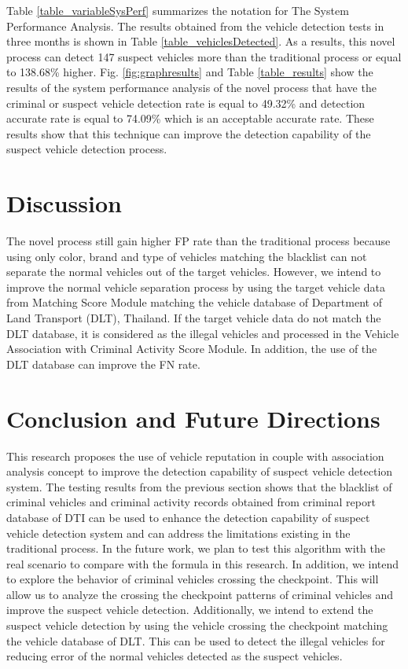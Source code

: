\documentclass{llncs}
\begin{document}
Table \ref{table_variableSysPerf} summarizes the notation for The System Performance Analysis.
The results obtained from the vehicle detection tests in three months is shown in Table \ref{table_vehiclesDetected}.
As a results, this novel process can detect 147 suspect vehicles more than the traditional process or equal to 138.68\% higher.
Fig. \ref{fig:graphresults} and Table \ref{table_results} show the results of the system performance analysis of the novel process that have the criminal or suspect vehicle detection rate is equal to 49.32\% and detection accurate rate is equal to 74.09\% which is an acceptable accurate rate. These results show that this technique can improve the detection capability of the suspect vehicle detection process.

\section{Discussion}
The novel process still gain higher FP rate than the traditional process because using only color, brand and type of vehicles matching the blacklist can not separate the normal vehicles out of the target vehicles. However, we intend to improve the normal vehicle separation process by using the target vehicle data from Matching Score Module matching the vehicle database of Department of Land Transport (DLT), Thailand. If the target vehicle data do not match the DLT database, it is considered as the illegal vehicles and processed in the Vehicle Association with Criminal Activity Score Module. In addition, the use of the DLT database can improve the FN rate.

\section{Conclusion and Future Directions}
This research proposes the use of vehicle reputation in couple with association analysis concept to improve the detection capability of suspect vehicle detection system.
The testing results from the previous section shows that the blacklist of criminal vehicles and criminal activity records obtained from criminal report database of DTI can be used to enhance the detection capability of suspect vehicle detection system and can address the limitations existing in the traditional process. 
In the future work, we plan to test this algorithm with the real scenario to compare with the formula in this research. 
In addition, we intend to explore the behavior of criminal vehicles crossing the checkpoint. This will allow us to analyze the crossing the checkpoint patterns of criminal vehicles and improve the suspect vehicle detection. Additionally, we intend to extend the suspect vehicle detection by using the vehicle crossing the checkpoint matching the vehicle database of DLT. This can be used to detect the illegal vehicles for reducing error of the normal vehicles detected as the suspect vehicles.
\end{document}
